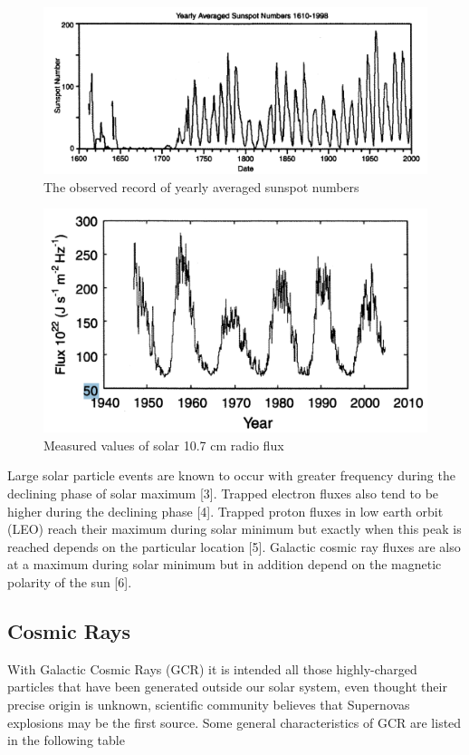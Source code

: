 \documentclass[./dissertation.tex]{subfiles}
\begin{document}
\begin{figure}[h!]
\centering
  \includegraphics[scale = 0.50]{imgs/sunspot.PNG}
  \caption{The observed record of yearly averaged sunspot numbers \cite{bib2}}
  \label{fig:magnetosphere}
\end{figure}
\begin{figure}[h!]
\centering
  \includegraphics[scale = 0.50]{imgs/F10sun.PNG}
  \caption{Measured values of solar 10.7 cm radio flux \cite{bib2}}
  \label{fig:magnetosphere}
\end{figure}

Large solar particle events  are known to occur  with greater    frequency   during   the    declining   phase of solar maximum [3]. Trapped  electron  fluxes  also  tend to be  higher during the declining  phase [4]. Trapped proton  fluxes in  low earth  orbit (LEO) reach their  maximum during solar minimum but exactly when this peak is reached depends on the particular location [5]. Galactic cosmic ray fluxes are also at a maximum during  solar minimum but  in addition  depend  on the magnetic polarity of the sun [6]. 

\newpage

\subsection{Cosmic Rays}
With Galactic Cosmic Rays (GCR) it is intended all those highly-charged particles that have been generated outside our solar system, even thought their precise origin  is unknown, scientific community believes that Supernovas explosions may be the first source. Some general characteristics of GCR are listed in the following table
\end{document}
